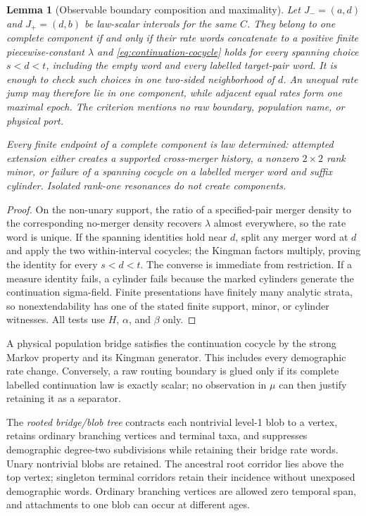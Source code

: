 \documentclass[11pt]{article}
\newtheorem{lemma}[theorem]{Lemma}
\begin{document}
\begin{lemma}[Observable boundary composition and maximality]
\label{lem:cocycle-boundary}
Let $J_-=(a,d)$ and $J_+=(d,b)$ be law-scalar intervals for the same $C$.  They belong to one complete component if and only if their rate words concatenate to a positive finite piecewise-constant $\lambda$ and \eqref{eq:continuation-cocycle} holds for every spanning choice $s<d<t$, including the empty word and every labelled target-pair word.  It is enough to check such choices in one two-sided neighborhood of $d$.  An unequal rate jump may therefore lie in one component, while adjacent equal rates form one maximal epoch.  The criterion mentions no raw boundary, population name, or physical port.

Every finite endpoint of a complete component is law determined: attempted extension either creates a supported cross-merger history, a nonzero $2\times2$ rank minor, or failure of a spanning cocycle on a labelled merger word and suffix cylinder.  Isolated rank-one resonances do not create components.
\end{lemma}

\begin{proof}
On the non-unary support, the ratio of a specified-pair merger density to the corresponding no-merger density recovers $\lambda$ almost everywhere, so the rate word is unique.  If the spanning identities hold near $d$, split any merger word at $d$ and apply the two within-interval cocycles; the Kingman factors multiply, proving the identity for every $s<d<t$.  The converse is immediate from restriction.  If a measure identity fails, a cylinder fails because the marked cylinders generate the continuation sigma-field.  Finite presentations have finitely many analytic strata, so nonextendability has one of the stated finite support, minor, or cylinder witnesses.  All tests use $H$, $\alpha$, and $\beta$ only.
\end{proof}

A physical population bridge satisfies the continuation cocycle by the strong Markov property and its Kingman generator.  This includes every demographic rate change.  Conversely, a raw routing boundary is glued only if its complete labelled continuation law is exactly scalar; no observation in $\mu$ can then justify retaining it as a separator.

The \emph{rooted bridge/blob tree} contracts each nontrivial level-1 blob to a vertex, retains ordinary branching vertices and terminal taxa, and suppresses demographic degree-two subdivisions while retaining their bridge rate words.  Unary nontrivial blobs are retained.  The ancestral root corridor lies above the top vertex; singleton terminal corridors retain their incidence without unexposed demographic words.  Ordinary branching vertices are allowed zero temporal span, and attachments to one blob can occur at different ages.
\end{document}
